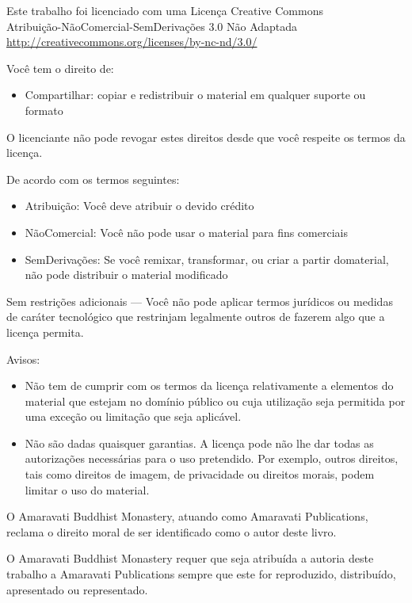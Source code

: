 
\thispagestyle{plain}

{\small
\setlength{\parindent}{0pt}%
\raggedright\label{copyright-details}
\setlength{\parskip}{10pt}
{\centering

{\Huge\ccbyncnd}

Este trabalho foi licenciado com uma Licença Creative Commons\\
Atribuição-NãoComercial-SemDerivações 3.0 Não Adaptada\\
\href{http://creativecommons.org/licenses/by-nc-nd/3.0/}{http://creativecommons.org/licenses/by-nc-nd/3.0/}

}

Você tem o direito de:

\begin{itemize}
\item Compartilhar: copiar e redistribuir o material em qualquer suporte ou formato
\end{itemize}

O licenciante não pode revogar estes direitos desde que você respeite os termos da licença.

De acordo com os termos seguintes:

\begin{itemize}
\item Atribuição: Você deve atribuir o devido crédito
\item NãoComercial: Você não pode usar o material para fins comerciais
\item SemDerivações: Se você remixar, transformar, ou criar a partir domaterial, não pode distribuir o material modificado
\end{itemize}

Sem restrições adicionais — Você não pode aplicar termos jurídicos ou medidas de caráter tecnológico que restrinjam legalmente outros de fazerem algo que a licença permita.

Avisos:

\begin{itemize}
\item Não tem de cumprir com os termos da licença relativamente a elementos do
  material que estejam no domínio público ou cuja utilização seja permitida por
  uma exceção ou limitação que seja aplicável.
\item Não são dadas quaisquer garantias. A licença pode não lhe dar todas as
  autorizações necessárias para o uso pretendido. Por exemplo, outros direitos,
  tais como direitos de imagem, de privacidade ou direitos morais, podem limitar
  o uso do material.
\end{itemize}

O Amaravati Buddhist Monastery, atuando como Amaravati Publications, reclama o
direito moral de ser identificado como o autor deste livro.

O Amaravati Buddhist Monastery requer que seja atribuída a autoria deste
trabalho a Amaravati Publications sempre que este for reproduzido, distribuído,
apresentado ou representado.

}
